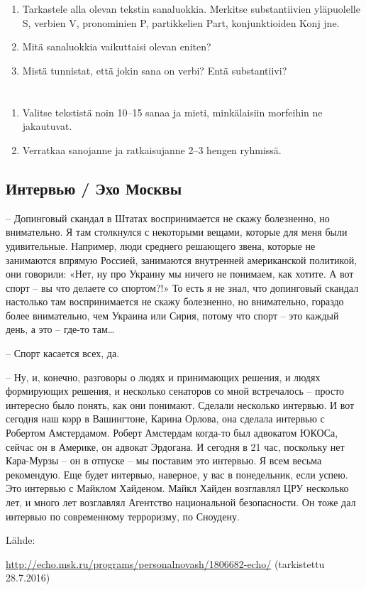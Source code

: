\documentclass[paper=a4, fontsize=11pt]{scrartcl}
\begin{document}
\onehalfspacing

\section{}

\begin{enumerate}
    \item Tarkastele alla olevan tekstin sanaluokkia. Merkitse substantiivien
        yläpuolelle S, verbien V, pronominien P, partikkelien Part,
        konjunktioiden Konj jne.
    \item Mitä sanaluokkia vaikuttaisi olevan eniten?
    \item Mistä tunnistat, että jokin sana on verbi? Entä substantiivi?
\end{enumerate}

\section{}

\begin{enumerate}
    \item Valitse tekstistä noin 10--15 sanaa ja mieti, minkälaisiin morfeihin
        ne jakautuvat.
    \item Verratkaa sanojanne ja ratkaisujanne 2--3 hengen ryhmissä.
\end{enumerate}

\subsection*{Интервью / Эхо
Москвы}

-- Допинговый скандал в Штатах воспринимается не скажу болезненно, но
внимательно. Я там столкнулся с некоторыми вещами, которые для меня были
удивительные. Например, люди среднего решающего звена, которые не
занимаются впрямую Россией, занимаются внутренней американской
политикой, они говорили: «Нет, ну про Украину мы ничего не понимаем, как
хотите. А вот спорт -- вы что делаете со спортом?!» То есть я не знал,
что допинговый скандал настолько там воспринимается не скажу болезненно,
но внимательно, гораздо более внимательно, чем Украина или Сирия, потому
что спорт -- это каждый день, а это -- где-то там\ldots{}

-- Спорт касается всех, да.

-- Ну, и, конечно, разговоры о людях и принимающих решения, и людях
формирующих решения, и несколько сенаторов со мной встречалось -- просто
интересно было понять, как они понимают. Сделали несколько интервью. И
вот сегодня наш корр в Вашингтоне, Карина Орлова, она сделала интервью с
Робертом Амстердамом. Роберт Амстердам когда-то был адвокатом ЮКОСа,
сейчас он в Америке, он адвокат Эрдогана. И сегодня в 21 час, поскольку
нет Кара-Мурзы -- он в отпуске -- мы поставим это интервью. Я всем
весьма рекомендую. Еще будет интервью, наверное, у вас в понедельник,
если успею. Это интервью с Майклом Хайденом. Майкл Хайден возглавлял ЦРУ
несколько лет, и много лет возглавлял Агентство национальной
безопасности. Он тоже дал интервью по современному терроризму, по
Сноудену.

Lähde:

\url{http://echo.msk.ru/programs/personalnovash/1806682-echo/}
(tarkistettu 28.7.2016)
\end{document}
